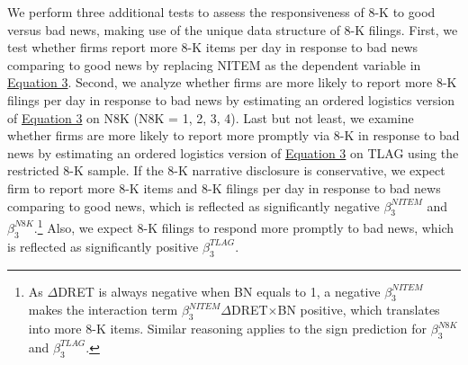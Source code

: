 \documentclass[a4paper]{article}
\begin{document}
\begin{spacing}{2}
We perform three additional tests to assess the responsiveness of 8-K to good versus bad news, making use of the unique data structure of 8-K filings. First, we test whether firms report more 8-K items per day in response to bad news comparing to good news by replacing NITEM as the dependent variable in \hyperref[eq3]{Equation 3}. Second, we analyze whether firms are more likely to report more 8-K filings per day in response to bad news by estimating an ordered logistics version of \hyperref[eq3]{Equation 3} on N8K (N8K = 1, 2, 3, 4). Last but not least, we examine whether firms are more likely to report more promptly via 8-K in response to bad news by estimating an ordered logistics version of \hyperref[eq3]{Equation 3} on TLAG using the restricted 8-K sample. If the 8-K narrative disclosure is conservative, we expect firm to report more 8-K items and 8-K filings per day in response to bad news comparing to good news, which is reflected as significantly negative $\beta_3^{NITEM}$ and $\beta_3^{N8K}$.\footnote{As $\Delta$DRET is always negative when BN equals to 1, a negative $\beta_3^{NITEM}$ makes the interaction term $\beta_3^{NITEM}$$\Delta$DRET$\times$BN positive, which translates into more 8-K items. Similar reasoning applies to the sign prediction for $\beta_3^{N8K}$ and $\beta_3^{TLAG}$.} Also, we expect 8-K filings to respond more promptly to bad news, which is reflected as significantly positive $\beta_3^{TLAG}$.


\end{spacing}
\end{document}
